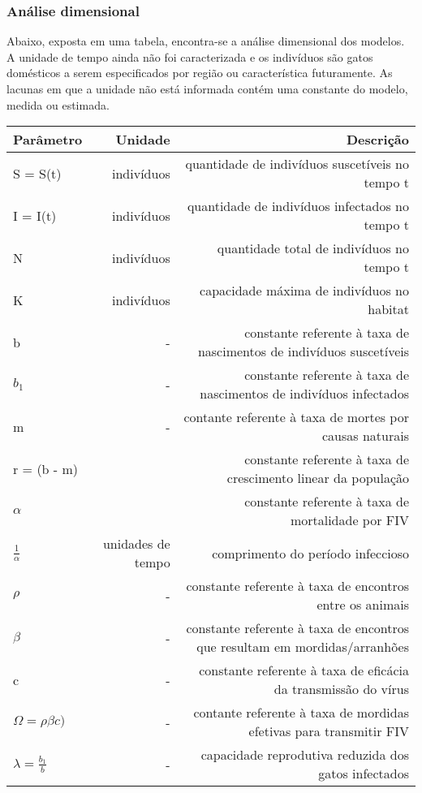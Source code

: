 \documentclass{article}
\begin{document}
\subsubsection{Análise dimensional}
Abaixo, exposta em uma tabela, encontra-se a análise dimensional dos modelos. A unidade de tempo ainda não foi caracterizada e os indivíduos são gatos domésticos a serem especificados por  região ou característica futuramente. As lacunas em que a unidade não está informada contém uma constante do modelo, medida ou estimada.
\begin{table}[!h]
    \centering
\begin{tabular}{| l | r | r |}
\hline
Parâmetro & Unidade & Descrição\\
\hline
S = S(t) & indivíduos & quantidade de indivíduos suscetíveis no tempo t\\
I = I(t) & indivíduos & quantidade de indivíduos infectados no tempo t\\
N & indivíduos & quantidade total de indivíduos no tempo t\\
K & indivíduos & capacidade máxima de indivíduos no habitat\\ 
b         & - & constante referente à taxa de nascimentos de indivíduos suscetíveis\\
$b_1$        & - & constante referente à taxa de nascimentos de indivíduos infectados\\
m        & - & contante referente à taxa de mortes por causas naturais\\
r = (b - m) & & constante referente à taxa de crescimento linear da população\\
$\alpha$ & & constante referente à taxa de mortalidade por FIV \\
$\frac{1}{\alpha}$ & unidades de tempo & comprimento do período infeccioso\\
$\rho$ & - & constante referente à taxa de encontros entre os animais\\
$\beta$ & - & constante referente à taxa de encontros que resultam em mordidas/arranhões\\
c & - & constante referente à taxa de eficácia da transmissão do vírus \\
$\Omega = \rho\beta c)$ & - & contante referente à taxa de mordidas efetivas para transmitir FIV\\
$\lambda = \frac{b_1}{b}$ & - & capacidade reprodutiva reduzida dos gatos infectados\\
\hline
\end{tabular}
\end{table}

\newpage 
%

\end{document}
